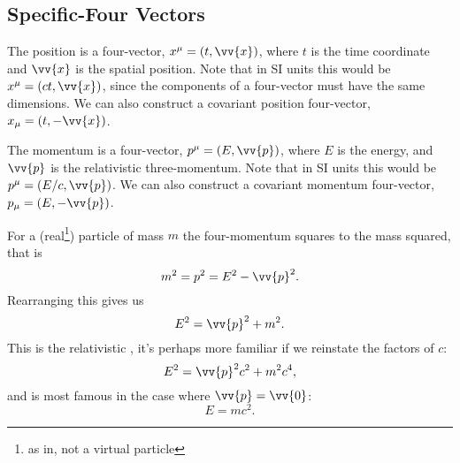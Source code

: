 \documentclass[fleqn]{NotesClass}
\begin{document}
    \subsection{Specific-Four Vectors}
    The position is a four-vector, \(x^\mu = (t, \vv{x})\), where \(t\) is the time coordinate and \(\vv{x}\) is the spatial position.
    Note that in SI units this would be \(x^\mu = (ct, \vv{x})\), since the components of a four-vector must have the same dimensions.
    We can also construct a covariant position four-vector, \(x_\mu = (t, -\vv{x})\).
    
    The momentum is a four-vector, \(p^\mu = (E, \vv{p})\), where \(E\) is the energy, and \(\vv{p}\) is the relativistic three-momentum.
    Note that in SI units this would be \(p^\mu = (E/c, \vv{p})\).
    We can also construct a covariant momentum four-vector, \(p_\mu = (E, -\vv{p})\).
    
    For a (real\footnote{as in, not a virtual particle}) particle of mass \(m\) the four-momentum squares to the mass squared, that is
    \begin{equation}
        m^2 = p^2 = E^2 - \vv{p}^2.
    \end{equation}
    Rearranging this gives us
    \begin{equation}
        E^2 = \vv{p}^2 + m^2.
    \end{equation}
    This is the relativistic , it's perhaps more familiar if we reinstate the factors of \(c\):
    \begin{equation}
        E^2 = \vv{p}^2c^2 + m^2c^4,
    \end{equation}
    and is most famous in the case where \(\vv{p} = \vv{0}\):
    \begin{equation}
        E = mc^2.
    \end{equation}
    
\end{document}
